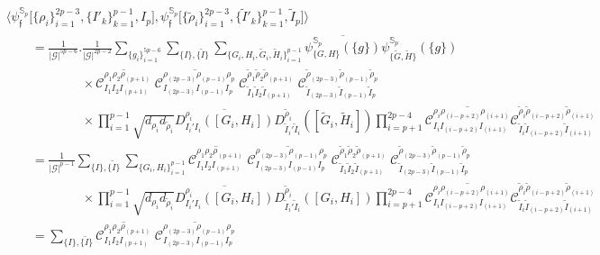 \documentclass[nofootinbib,superscriptaddress,eqsecnum,tightenlines,11pt]{revtex4-1}
\def\nn{\nonumber}
\def\q{\qquad}
\def\wG{\widetilde{G}}
\def\wH{\widetilde{H}}
\def\mG{\mathcal{G}}
\renewcommand{\S}{{\mathbb S}}
\renewcommand{\tilde}{\widetilde}
\begin{document}
\begin{align} \nn
	&\Big\langle \psi_{\mathfrak{f}}^{\S_p} \big[ \{\rho_i\}_{i=1}^{2p-3},\{I'_k\}_{k=1}^{p-1},I_p \big] , \psi_{\mathfrak{f}}^{\S_p}\big[\{\tilde{\rho}_i\}_{i=1}^{2p-3},\{\tilde{I}'_k\}_{k=1}^{p-1},\tilde{I}_p \big] \Big\rangle \\ \nn
	&\q = \frac{1}{|\mG|^{5p-6}}.\frac{1}{|\mG|^{2p-2}}\sum_{\{g_i\}_{i=1}^{5p-6}}\sum_{\{I\},\{\tilde{I}\}} \sum_{\{G_i,H_i,\wG_i,\wH_i\}_{i=1}^{p-1}}
	\overline{\psi^{\S_p}_{\{G,H\}}(\{g\})}\psi^{\S_p}_{\{\wG,\wH\}}(\{g\}) \\ \nn
	& \q \q \q \times \overline{\mathcal{C}^{\rho_1\rho_2\rho_{(p+1)}}_{I_1I_2I_{(p+1)}}}\; \overline{\mathcal{C}^{\rho_{(2p-3)}\rho_{(p-1)}\rho_p}_{I_{(2p-3)}I_{(p-1)}I_p}}\;
	 \mathcal{C}^{\tilde{\rho}_1 \tilde{\rho}_2\tilde{\rho}_{(p+1)}}_{\tilde{I}_1\tilde{I}_2\tilde{I}_{(p+1)}}\;
	\mathcal{C}^{\tilde{\rho}_{(2p-3)}\tilde{\rho}_{(p-1)}\tilde{\rho}_p}_{\tilde{I}_{(2p-3)}\tilde{I}_{(p-1)}\tilde{I}_p}\\ \nn
	& \q \q \q \times \prod_{i=1}^{p-1}\sqrt{d_{\rho_i}d_{\tilde{\rho}_i}}\overline{D^{\rho_i}_{I_i'I_i}([G_i,H_i])}D^{\tilde{\rho}_i}_{\tilde{I}_i'\tilde{I}_i}([\wG_i,\wH_i])
	\prod_{i=p+1}^{2p-4}\overline{\mathcal{C}^{\rho_i\rho_{(i-p+2)}\rho_{(i+1)}}_{I_iI_{(i-p+2)}I_{(i+1)}}}
	\mathcal{C}^{\tilde{\rho}_i\tilde{\rho}_{(i-p+2)}\tilde{\rho}_{(i+1)}}_{\tilde{I}_i\tilde{I}_{(i-p+2)}\tilde{I}_{(i+1)}} \\ \nn
	&\q = \frac{1}{|\mG|^{p-1}}\sum_{\{I\},\{\tilde{I}\}}\sum_{\{G_i,H_i\}_{i=1}^{p-1}} \overline{\mathcal{C}^{\rho_1\rho_2\rho_{(p+1)}}_{I_1I_2I_{(p+1)}}}\; \overline{\mathcal{C}^{\rho_{(2p-3)}\rho_{(p-1)}\rho_p}_{I_{(2p-3)}I_{(p-1)}I_p}}\;
	 \mathcal{C}^{\tilde{\rho}_1 \tilde{\rho}_2\tilde{\rho}_{(p+1)}}_{\tilde{I}_1\tilde{I}_2\tilde{I}_{(p+1)}}\;
	\mathcal{C}^{\tilde{\rho}_{(2p-3)}\tilde{\rho}_{(p-1)}\tilde{\rho}_p}_{\tilde{I}_{(2p-3)}\tilde{I}_{(p-1)}\tilde{I}_p}\\ \nn
	& \q \q \q \times \prod_{i=1}^{p-1}\sqrt{d_{\rho_i}d_{\tilde{\rho}_i}}\overline{D^{\rho_i}_{I_i'I_i}([G_i,H_i])}D^{\tilde{\rho}_i}_{\tilde{I}_i'\tilde{I}_i}([G_i,H_i])
	\prod_{i=p+1}^{2p-4}\overline{\mathcal{C}^{\rho_i\rho_{(i-p+2)}\rho_{(i+1)}}_{I_iI_{(i-p+2)}I_{(i+1)}}}
	\mathcal{C}^{\tilde{\rho}_i\tilde{\rho}_{(i-p+2)}\tilde{\rho}_{(i+1)}}_{\tilde{I}_i\tilde{I}_{(i-p+2)}\tilde{I}_{(i+1)}} \\ \nn
	& \q = \sum_{\{I\},\{\tilde{I}\}} \overline{\mathcal{C}^{\rho_1\rho_2\rho_{(p+1)}}_{I_1I_2I_{(p+1)}}}\; 	\overline{\mathcal{C}^{\rho_{(2p-3)}\rho_{(p-1)}\rho_p}_{I_{(2p-3)}I_{(p-1)}I_p}}\;

\end{align}
\end{document}
